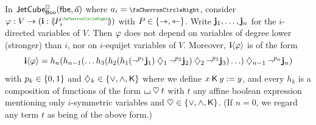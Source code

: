 \documentclass[a4paper]{memoir}
\begin{document}
\begin{lemma} \label{thm:char-jet-cube-to-line}
	In $\mathsf{JetCube}^{\Box}_{\mathsf{Boo}}({\mathsf{fbe}},\vec a)$ where $a_i = \ypolar$, consider $\vfi : V \to (\dm i : \rival{P_i\pmr{\ypolar}})$ with $P \in \mathopen{}\left\{ \rightarrowtriangle, \leftarrowtriangle \right\}\mathclose{}$.
	Write $\mathbf{j}_1, \ldots, \mathbf{j}_n$ for the $i$-directed variables of $V$.
	Then $\varphi$ does not depend on variables of degree lower (stronger) than $i$, nor on $i$-equijet variables of $V$.
	Moreover, $\mathbf{i} \langle \varphi \rangle$ is of the form
	\[
		\mathbf{i} \langle \varphi \rangle = h_n(h_{n-1}(\ldots h_3(h_2(h_1(\lnot^{p_1} \mathbf{j}_1) \mathbin{\diamondsuit}_1 \lnot^{p_2} \mathbf{j}_2) \mathbin{\diamondsuit}_2 \lnot^{p_3} \mathbf{j}_3) \ldots ) \mathbin{\diamondsuit}_{n-1} \lnot^{p_n} \mathbf{j}_n)
	\]
	with $p_k \in \mathopen{}\left\{ 0, 1 \right\}\mathclose{}$ and $\mathbin{\diamondsuit}_k \in \mathopen{}\left\{ {\vee}, {\wedge}, {\mathbin{\mathsf{K}}} \right\}\mathclose{}$ where we define $x \mathbin{\mathsf{K}} y := y$, and every $h_k$ is a composition of functions of the form ${\llcorner\hspace{-.4ex}\lrcorner} \mathbin{\heartsuit} t$ with $t$ any affine boolean expression mentioning only $i$-symmetric variables and ${\mathbin{\heartsuit}} \in \mathopen{}\left\{ {\vee}, {\wedge}, {\mathbin{\mathsf{K}}} \right\}\mathclose{}$.
	(If $n = 0$, we regard any term $t$ as being of the above form.)
\end{lemma}
\end{document}
